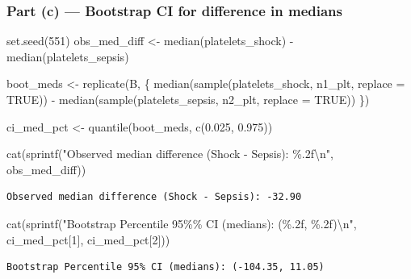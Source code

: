 \documentclass[
  letterpaper,
  DIV=11,
  numbers=noendperiod]{scrartcl}
\newenvironment{Shaded}{\begin{snugshade}}{\end{snugshade}}
\newcommand{\AttributeTok}[1]{\textcolor[rgb]{0.40,0.45,0.13}{#1}}
\newcommand{\ConstantTok}[1]{\textcolor[rgb]{0.56,0.35,0.01}{#1}}
\newcommand{\DecValTok}[1]{\textcolor[rgb]{0.68,0.00,0.00}{#1}}
\newcommand{\FloatTok}[1]{\textcolor[rgb]{0.68,0.00,0.00}{#1}}
\newcommand{\FunctionTok}[1]{\textcolor[rgb]{0.28,0.35,0.67}{#1}}
\newcommand{\NormalTok}[1]{\textcolor[rgb]{0.00,0.23,0.31}{#1}}
\newcommand{\OtherTok}[1]{\textcolor[rgb]{0.00,0.23,0.31}{#1}}
\newcommand{\SpecialCharTok}[1]{\textcolor[rgb]{0.37,0.37,0.37}{#1}}
\newcommand{\StringTok}[1]{\textcolor[rgb]{0.13,0.47,0.30}{#1}}
\begin{document}
\subsubsection{Part (c) --- Bootstrap CI for difference in
medians}\label{part-c-bootstrap-ci-for-difference-in-medians}

\begin{Shaded}
\begin{Highlighting}[]
\FunctionTok{set.seed}\NormalTok{(}\DecValTok{551}\NormalTok{)}
\NormalTok{obs\_med\_diff }\OtherTok{\textless{}{-}} \FunctionTok{median}\NormalTok{(platelets\_shock) }\SpecialCharTok{{-}} \FunctionTok{median}\NormalTok{(platelets\_sepsis)}

\NormalTok{boot\_meds }\OtherTok{\textless{}{-}} \FunctionTok{replicate}\NormalTok{(B, \{}
  \FunctionTok{median}\NormalTok{(}\FunctionTok{sample}\NormalTok{(platelets\_shock,  n1\_plt, }\AttributeTok{replace =} \ConstantTok{TRUE}\NormalTok{)) }\SpecialCharTok{{-}}
  \FunctionTok{median}\NormalTok{(}\FunctionTok{sample}\NormalTok{(platelets\_sepsis, n2\_plt, }\AttributeTok{replace =} \ConstantTok{TRUE}\NormalTok{))}
\NormalTok{\})}

\NormalTok{ci\_med\_pct }\OtherTok{\textless{}{-}} \FunctionTok{quantile}\NormalTok{(boot\_meds, }\FunctionTok{c}\NormalTok{(}\FloatTok{0.025}\NormalTok{, }\FloatTok{0.975}\NormalTok{))}

\FunctionTok{cat}\NormalTok{(}\FunctionTok{sprintf}\NormalTok{(}\StringTok{"Observed median difference (Shock {-} Sepsis): \%.2f}\SpecialCharTok{\textbackslash{}n}\StringTok{"}\NormalTok{, obs\_med\_diff))}
\end{Highlighting}
\end{Shaded}

\begin{verbatim}
Observed median difference (Shock - Sepsis): -32.90
\end{verbatim}

\begin{Shaded}
\begin{Highlighting}[]
\FunctionTok{cat}\NormalTok{(}\FunctionTok{sprintf}\NormalTok{(}\StringTok{"Bootstrap Percentile 95\%\% CI (medians): (\%.2f, \%.2f)}\SpecialCharTok{\textbackslash{}n}\StringTok{"}\NormalTok{,}
\NormalTok{            ci\_med\_pct[}\DecValTok{1}\NormalTok{], ci\_med\_pct[}\DecValTok{2}\NormalTok{]))}
\end{Highlighting}
\end{Shaded}

\begin{verbatim}
Bootstrap Percentile 95% CI (medians): (-104.35, 11.05)
\end{verbatim}
\end{document}
